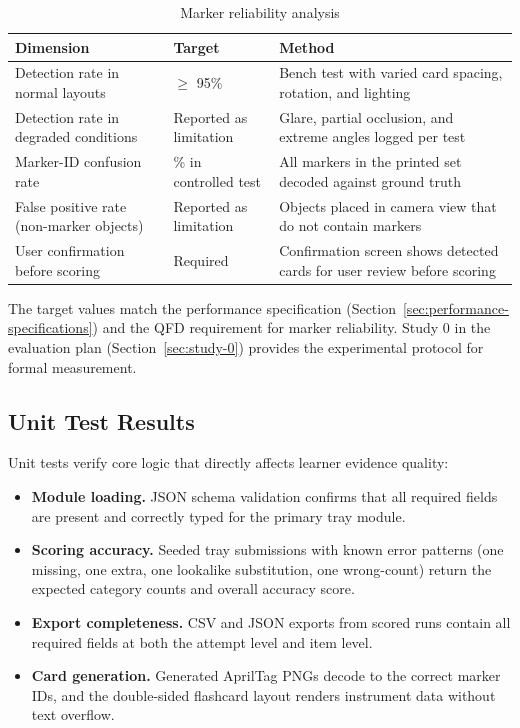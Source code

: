 \documentclass[10pt,a4paper]{article}
\begin{document}
\begin{table}[H]
\centering
\caption{Marker reliability analysis}
\label{tab:marker-reliability-analysis}
\small\renewcommand{\arraystretch}{1.2}\setlength{\tabcolsep}{4pt}
\begin{tabularx}{\textwidth}{|>{\raggedright\arraybackslash}X|>{\raggedright\arraybackslash}X|>{\raggedright\arraybackslash}X|}
\hline
Dimension & Target & Method \\
\hline
Detection rate in normal layouts & $\ge$ 95\% & Bench test with varied card spacing, rotation, and lighting \\
\hline
Detection rate in degraded conditions & Reported as limitation & Glare, partial occlusion, and extreme angles logged per test \\
\hline
Marker-ID confusion rate & 0\% in controlled test & All markers in the printed set decoded against ground truth \\
\hline
False positive rate (non-marker objects) & Reported as limitation & Objects placed in camera view that do not contain markers \\
\hline
User confirmation before scoring & Required & Confirmation screen shows detected cards for user review before scoring \\
\hline
\end{tabularx}
\end{table}

The target values match the performance specification
(Section~\ref{sec:performance-specifications}) and the QFD requirement
for marker reliability. Study 0 in the evaluation plan
(Section~\ref{sec:study-0}) provides the experimental protocol for formal
measurement.

\subsection{Unit Test Results}
\label{sec:unit-test-results}

Unit tests verify core logic that directly affects learner evidence quality:

\begin{itemize}
  \item \textbf{Module loading.} JSON schema validation confirms that all required
  fields are present and correctly typed for the primary tray module.
  \item \textbf{Scoring accuracy.} Seeded tray submissions with known error patterns
  (one missing, one extra, one lookalike substitution, one wrong-count) return
  the expected category counts and overall accuracy score.
  \item \textbf{Export completeness.} CSV and JSON exports from scored runs contain
  all required fields at both the attempt level and item level.
  \item \textbf{Card generation.} Generated AprilTag PNGs decode to the correct
  marker IDs, and the double-sided flashcard layout renders instrument data
  without text overflow.
\end{itemize}
\end{document}
